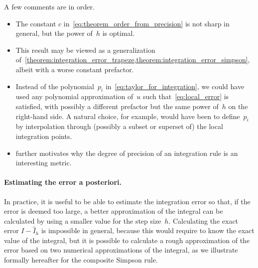 \begin{remark}
    A few comments are in order.
    \begin{itemize}
        \item 
            The constant $c$ in~\eqref{eq:theorem_order_from_precision} is not sharp in general,
            but the power of~$h$ is optimal.

        \item
            This result may be viewed as a generalization of~\cref{theorem:integration_error_trapeze,theorem:integration_error_simpson},
            albeit with a worse constant prefactor.

        \item 
            Instead of the polynomial~$p_i$ in~\eqref{eq:taylor_for_integration},
            we could have used any polynomial approximation of~$u$ such that~\eqref{eq:local_error} is satisfied,
            with possibly a different prefactor but the same power of~$h$ on the right-hand side.
            A natural choice, for example, 
            would have been to define~$p_i$ by interpolation through (possibly a subset or superset of) the local integration points.

        \item
             further motivates why the degree of precision of an integration rule is an interesting metric.
    \end{itemize}
\end{remark}

\paragraph{Estimating the error a posteriori.}
In practice,
it is useful to be able to estimate the integration error so that,
if the error is deemed too large,
a better approximation of the integral can be calculated by using a smaller value for the step size~$h$.
Calculating the exact error $I - \widehat I_h$ is impossible in general,
because this would require to know the exact value of the integral,
but it is possible to calculate a rough approximation of the error based on two numerical approximations of the integral,
as we illustrate formally hereafter for the composite Simpson rule.

